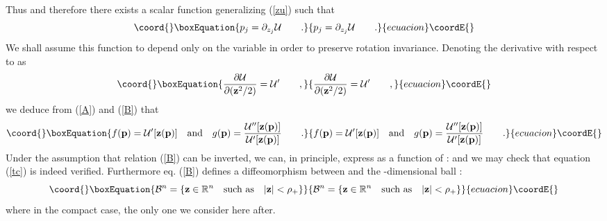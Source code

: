 \documentclass[a4paper,10pt]{article}
\providecommand{\bp}{\mbox{\rm{\bf p}}}
\providecommand{\bz}{\mbox{\rm{\bf z}}}
\providecommand{\et}{\mbox{\rm{and}}}
\providecommand{\cU}{{\cal U}}
\providecommand{\cZ}{{\cal Z}}
\providecommand{\cB}{{\cal B}}
\begin{document}
Thus \coordHE{} and
therefore there exists a scalar function \myHighlight{$\cU$}\coordHE{} generalizing
\myHighlight{$[u(p)]$}\coordHE{} (\ref{zu}) such that
\begin{equation}\coord{}\boxEquation{
p_j = \partial_{z_j} \cU \qquad . \label{B}
}{
p_j = \partial_{z_j} \cU \qquad . }{ecuacion}\coordE{}\end{equation}
We shall assume this function \myHighlight{$\cU$}\coordHE{} to depend only on the variable
\coordHE{} in order to preserve rotation invariance. Denoting
the derivative with respect to \myHighlight{$\bz^2 /2$}\coordHE{} as
\begin{equation}\coord{}\boxEquation{
\frac {\partial \cU}{\partial (\bz^2 /2)}=\cU ' \qquad ,
}{
\frac {\partial \cU}{\partial (\bz^2 /2)}=\cU ' \qquad ,
}{ecuacion}\coordE{}\end{equation}
we deduce from (\ref{A}) and (\ref{B}) that
\begin{equation}\coord{}\boxEquation{
f({\bp}) = {\cU}'[\bz(\bp)]\quad \et\quad g(\bp) = \frac{
{\cU}''[\bz(\bp)]} { {\cU}'[\bz(\bp)]} \qquad .
}{
f({\bp}) = {\cU}'[\bz(\bp)]\quad \et\quad g(\bp) = \frac{
{\cU}''[\bz(\bp)]} { {\cU}'[\bz(\bp)]} \qquad .
}{ecuacion}\coordE{}\end{equation}
Under the assumption that relation (\ref{B}) can be inverted, we
can, in principle, express \coordHE{} as a function of \coordHE{}: \myHighlight{$|{\bf z}| = \cZ (|{\bf p}|)$}\coordHE{} and we may check that equation
(\ref{tc}) is indeed verified. Furthermore eq. (\ref{B}) defines a
diffeomorphism between \coordHE{} and the \coordHE{}-dimensional ball
:
\begin{equation}\coord{}\boxEquation{
\cB^n = \{ {\bf z} \in \mathbb{R}^n \quad \mbox{such as} \quad
|{\bf z}| < \rho_+ \}
}{
\cB^n = \{ {\bf z} \in \mathbb{R}^n \quad \mbox{such as} \quad
|{\bf z}| < \rho_+ \}
}{ecuacion}\coordE{}\end{equation}
where \myHighlight{$\cZ ( +\infty) = \rho_+ < +\infty$}\coordHE{} in the compact case, the
only one we consider here after.
\end{document}
